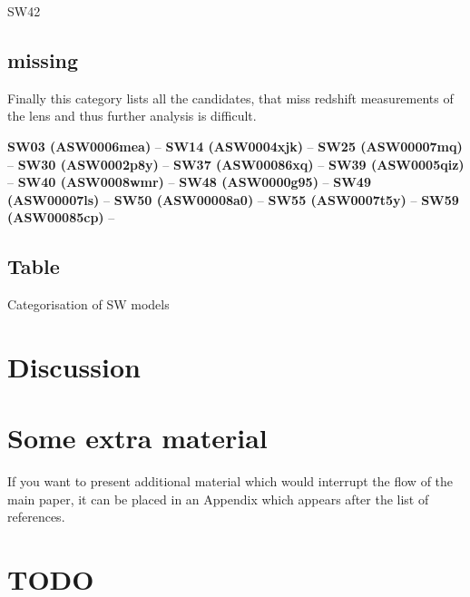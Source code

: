 \documentclass[fleqn,usenatbib]{mnras}
\newcommand{\lenstitle}[1]{\noindent\textbf{#1} --}
\begin{document}
SW42


\subsection{missing}

Finally this category lists all the candidates, that miss redshift measurements of the lens and thus further analysis is difficult.

\lenstitle{SW03 (ASW0006mea)}
\lenstitle{SW14 (ASW0004xjk)}
\lenstitle{SW25 (ASW00007mq)}
\lenstitle{SW30 (ASW0002p8y)}
\lenstitle{SW37 (ASW00086xq)}
\lenstitle{SW39 (ASW0005qiz)}
\lenstitle{SW40 (ASW0008wmr)}
\lenstitle{SW48 (ASW0000g95)}
\lenstitle{SW49 (ASW00007ls)}
\lenstitle{SW50 (ASW00008a0)}
\lenstitle{SW55 (ASW0007t5y)}
\lenstitle{SW59 (ASW00085cp)}


\subsection{Table}

\begin{table}
  \caption{Categorisation of SW models}
  \label{tab:models}
  
\end{table}



\section{Discussion}










\appendix

\section{Some extra material}

If you want to present additional material which would interrupt the flow of the main paper,
it can be placed in an Appendix which appears after the list of references.


\clearpage

\section{TODO}
\listoftodos

\bsp	%
\label{lastpage}
\end{document}
